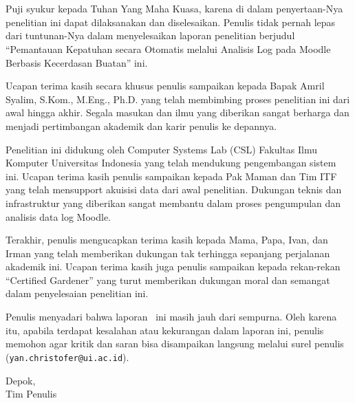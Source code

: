 \pagestyle{onlypage}
\chapter*{\kataPengantar}

Puji syukur kepada Tuhan Yang Maha Kuasa, karena di dalam penyertaan-Nya penelitian ini dapat dilaksanakan dan diselesaikan. Penulis tidak pernah lepas dari tuntunan-Nya dalam menyelesaikan laporan penelitian berjudul ``Pemantauan Kepatuhan secara Otomatis melalui Analisis Log pada Moodle Berbasis Kecerdasan Buatan'' ini.

Ucapan terima kasih secara khusus penulis sampaikan kepada Bapak Amril Syalim, S.Kom., M.Eng., Ph.D. yang telah membimbing proses penelitian ini dari awal hingga akhir. Segala masukan dan ilmu yang diberikan sangat berharga dan menjadi pertimbangan akademik dan karir penulis ke depannya.

Penelitian ini didukung oleh Computer Systems Lab (CSL) Fakultas Ilmu Komputer Universitas Indonesia yang telah mendukung pengembangan sistem ini. Ucapan terima kasih penulis sampaikan kepada Pak Maman dan Tim ITF yang telah mensupport akuisisi data dari awal penelitian. Dukungan teknis dan infrastruktur yang diberikan sangat membantu dalam proses pengumpulan dan analisis data log Moodle.

Terakhir, penulis mengucapkan terima kasih kepada Mama, Papa, Ivan, dan Irman yang telah memberikan dukungan tak terhingga sepanjang perjalanan akademik ini. Ucapan terima kasih juga penulis sampaikan kepada rekan-rekan ``Certified Gardener'' yang turut memberikan dukungan moral dan semangat dalam penyelesaian penelitian ini.

Penulis menyadari bahwa laporan \type~ini masih jauh dari sempurna. Oleh karena itu, apabila terdapat kesalahan atau kekurangan dalam laporan ini, penulis memohon agar kritik dan saran bisa disampaikan langsung melalui surel penulis (\texttt{yan.christofer@ui.ac.id}).



\vspace*{0.1cm}
\begin{flushright}
Depok, \tanggalSiapSidang\\[0.1cm]
\ifx\blank\npmDua
	\vspace*{1.5cm}
	\penulisSatu
\else
	Tim Penulis
\fi

\end{flushright}
